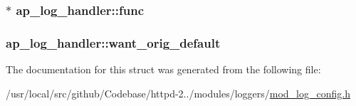 \subsubsection[{\texorpdfstring{func}{func}}]{$\ast$ ap\+\_\+log\+\_\+handler\+::func}\hypertarget{structap__log__handler_aabb0ef7d2d118585ec6cceabe90ccf7e}{}\label{structap__log__handler_aabb0ef7d2d118585ec6cceabe90ccf7e}
\subsubsection[{\texorpdfstring{want\+\_\+orig\+\_\+default}{want_orig_default}}]{ ap\+\_\+log\+\_\+handler\+::want\+\_\+orig\+\_\+default}\hypertarget{structap__log__handler_a37ebbaa820e7a49d279fc8419293285f}{}\label{structap__log__handler_a37ebbaa820e7a49d279fc8419293285f}


The documentation for this struct was generated from the following file\+:\begin{DoxyCompactItemize}
\item 
/usr/local/src/github/\+Codebase/httpd-\/2../modules/loggers/\hyperlink{mod__log__config_8h}{mod\+\_\+log\+\_\+config.\+h}\end{DoxyCompactItemize}
